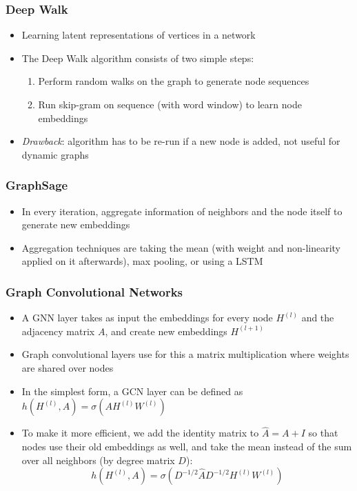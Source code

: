 \subsubsection{Deep Walk}
\begin{itemize}
	\item Learning latent representations of vertices in a network
	\item The Deep Walk algorithm consists of two simple steps:
	\begin{enumerate}
		\item Perform random walks on the graph to generate node sequences
		\item Run skip-gram on sequence (with word window) to learn node embeddings
	\end{enumerate}
	\item \textit{Drawback}: algorithm has to be re-run if a new node is added, not useful for dynamic graphs
\end{itemize}
\subsubsection{GraphSage}
\begin{itemize}
	\item In every iteration, aggregate information of neighbors and the node itself to generate new embeddings
	\item Aggregation techniques are taking the mean (with weight and non-linearity applied on it afterwards), max pooling, or using a LSTM
\end{itemize}
\subsubsection{Graph Convolutional Networks}
\begin{itemize}
	\item A GNN layer takes as input the embeddings for every node $H^{(l)}$ and the adjacency matrix $A$, and create new embeddings $H^{(l+1)}$
	\item Graph convolutional layers use for this a matrix multiplication where weights are shared over nodes
	\item In the simplest form, a GCN layer can be defined as $h(H^{(l)}, A) = \sigma\left(A H^{(l)} W^{(l)}\right)$
	\item To make it more efficient, we add the identity matrix to $\hat{A} = A + I$ so that nodes use their old embeddings as well, and take the mean instead of the sum over all neighbors (by degree matrix $D$):
	$$h(H^{(l)}, A) = \sigma\left(D^{-1/2}\hat{A}D^{-1/2} H^{(l)} W^{(l)}\right)$$
\end{itemize}